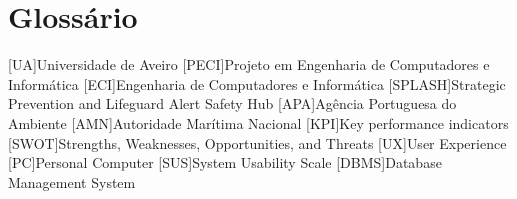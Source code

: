 \chapter{Glossário}

\footnotesize
\SingleSpacing

\begin{multicols}{2}
\begin{acronym}[AAAAAA]

	[UA]{Universidade de Aveiro}
	[PECI]{Projeto em Engenharia de Computadores e Informática}
    [ECI]{Engenharia de Computadores e Informática}
	[SPLASH]{Strategic Prevention and Lifeguard Alert Safety Hub}
    [APA]{Agência Portuguesa do Ambiente}
    [AMN]{Autoridade Marítima Nacional}
    [KPI]{Key performance indicators}
    [SWOT]{Strengths, Weaknesses, Opportunities, and Threats}
    [UX]{User Experience}
    [PC]{Personal Computer}
    [SUS]{System Usability Scale}
    [DBMS]{Database Management System}
\end{acronym}
\end{multicols}

